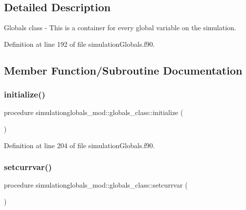 \subsection{Detailed Description}
Globals class -\/ This is a container for every global variable on the simulation. 

Definition at line 192 of file simulation\+Globals.\+f90.



\subsection{Member Function/\+Subroutine Documentation}
\mbox{\label{structsimulationglobals__mod_1_1globals__class_a3b8fe335ee4571c73b774cbbe37820cf}} 
\subsubsection{\texorpdfstring{initialize()}{initialize()}}
{\footnotesize\ttfamily procedure simulationglobals\+\_\+mod\+::globals\+\_\+class\+::initialize (\begin{DoxyParamCaption}{ }\end{DoxyParamCaption})\hspace{0.3cm}{\ttfamily [private]}}



Definition at line 204 of file simulation\+Globals.\+f90.

\mbox{\label{structsimulationglobals__mod_1_1globals__class_ae1d8dcce038856889fec915c28a054ce}} 
\subsubsection{\texorpdfstring{setcurrvar()}{setcurrvar()}}
{\footnotesize\ttfamily procedure simulationglobals\+\_\+mod\+::globals\+\_\+class\+::setcurrvar (\begin{DoxyParamCaption}{ }\end{DoxyParamCaption})\hspace{0.3cm}{\ttfamily [private]}}



